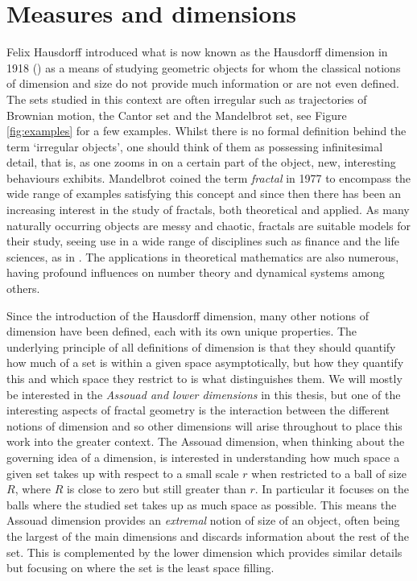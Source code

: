 \chapter{Measures and dimensions}
\label{chap:intro}



Felix Hausdorff introduced what is now known as the Hausdorff dimension in 1918 (\cite{hausdorff}) as a means of studying geometric objects for whom the classical notions of dimension and size do not provide much information or are not even defined. The sets studied in this context are often irregular such as trajectories of Brownian motion, the Cantor set and the Mandelbrot set, see Figure \ref{fig:examples} for a few examples. Whilst there is no formal definition behind the term `irregular objects', one should think of them as possessing infinitesimal detail, that is, as one zooms in on a certain part of the object, new, interesting behaviours exhibits. Mandelbrot \cite{mandelbrot} coined the term \textit{fractal} in 1977 to encompass the wide range of examples satisfying this concept and since then there has been an increasing interest in the study of fractals, both theoretical and applied. As many naturally occurring objects are messy and chaotic, fractals are suitable models for their study, seeing use in a wide range of disciplines such as finance and the life sciences, as in \cite{some applications, see messages from alex}. The applications in theoretical mathematics are also numerous, having profound influences on number theory and dynamical systems among others. 

Since the introduction of the Hausdorff dimension, many other notions of dimension have been defined, each with its own unique properties. The underlying principle of all definitions of dimension is that they should quantify how much of a set is within a given space asymptotically, but how they quantify this and which space they restrict to is what distinguishes them. We will mostly be interested in the \textit{Assouad and lower dimensions} in this thesis, but one of the interesting aspects of fractal geometry is the interaction between the different notions of dimension and so other dimensions will arise throughout to place this work into the greater context. The Assouad dimension, when thinking about the governing idea of a dimension, is interested in understanding how much space a given set takes up with respect to a small scale $r$ when restricted to a ball of size $R$, where $R$ is close to zero but still greater than $r$. In particular it focuses on the balls where the studied set takes up as much space as possible. This means the Assouad dimension provides an \textit{extremal} notion of size of an object, often being the largest of the main dimensions and discards information about the rest of the set. This is complemented by the lower dimension which provides similar details but focusing on where the set is the least space filling.  


